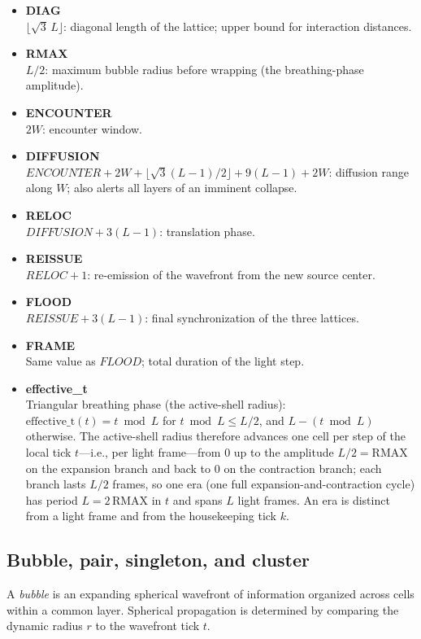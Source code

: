 \documentclass{ijuc}
\begin{document}
\begin{itemize}
\item \textbf{DIAG}\\
$\lfloor\sqrt{3}\,L\rfloor$: diagonal length of the lattice; upper bound for interaction distances.
\item \textbf{RMAX}\\
$L/2$: maximum bubble radius before wrapping (the breathing-phase amplitude).
\item \textbf{ENCOUNTER}\\
$2W$: encounter window.
\item \textbf{DIFFUSION} \\
$ENCOUNTER + 2W + \lfloor\sqrt{3}(L-1)/2\rfloor + 9(L-1) + 2W$: diffusion range along $W$; also alerts all layers of an imminent collapse.
\item \textbf{RELOC}\\
$DIFFUSION + 3(L-1)$: translation phase.
\item \textbf{REISSUE}\\
$RELOC + 1$: re-emission of the wavefront from the new source center.
\item \textbf{FLOOD}\\
$REISSUE + 3(L-1)$: final synchronization of the three lattices.
\item \textbf{FRAME}\\
Same value as $FLOOD$; total duration of the light step.
\item \textbf{effective\_t}\\
Triangular breathing phase (the active-shell radius): $\mathrm{effective\_t}(t)=t\bmod L$ for $t\bmod L\le L/2$, and $L-(t\bmod L)$ otherwise.  The active-shell radius therefore advances one cell per step of the local tick $t$---i.e., per light frame---from $0$ up to the amplitude $L/2=\mathrm{RMAX}$ on the expansion branch and back to $0$ on the contraction branch; each branch lasts $L/2$ frames, so one era (one full expansion-and-contraction cycle) has period $L=2\,\mathrm{RMAX}$ in $t$ and spans $L$ light frames.  An era is distinct from a light frame and from the housekeeping tick $k$.
\end{itemize}
\subsection{Bubble, pair, singleton, and cluster} \label{subsec:pairs}
A \emph{bubble} is an expanding spherical wavefront of information organized across cells within a common layer. Spherical propagation is determined by comparing the dynamic radius $r$ to the wavefront tick $t$.
\end{document}
